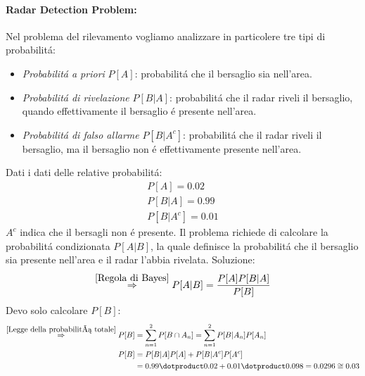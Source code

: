             \paragraph{Radar Detection Problem:} Nel problema del rilevamento vogliamo analizzare in particolere tre tipi di probabilitá:
                \begin{itemize}
                    \item {
                        \emph{Probabilitá a priori} $P[A]$: probabilitá che il bersaglio sia nell'area.
                    }
                    \item {
                        \emph{Probabilitá di rivelazione} $P[B|A]$: probabilitá che il radar riveli il bersaglio, quando effettivamente il bersaglio
                         é presente nell'area.
                    }
                    \item {
                        \emph{Probabilitá di falso allarme} $P[B|A^c]$: probabilitá che il radar riveli il bersaglio, ma il bersaglio non
                         é effettivamente presente nell'area. 
                    }
                \end{itemize}
                Dati i dati delle relative probabilitá:
                \begin{gather}
                    P[A] = 0.02 \nonumber \\
                    P[B|A] = 0.99 \nonumber \\
                    P[B|A^c] = 0.01 \nonumber 
                \end{gather}
                $A^c$ indica che il bersagli non é presente. Il problema richiede di calcolare la probabilitá condizionata
                $P[A|B]$, la quale definisce la probabilitá che il bersaglio sia presente nell'area e il radar l'abbia rivelata.
                Soluzione:
                \[
                    \overset{\ref{Regola di Bayes}}{\Rightarrow} P[A|B] = \frac{P[A]P[B|A]}{P[B]}    
                \]                    
                Devo solo calcolare $P[B]$:
                \begin{align}
                        \overset{\ref{Legge della probabilitá totale}}{\Rightarrow} P[B] &= \sum_{n=1}^{2} P[B\cap A_n] = \sum_{n=1}^{2} P[B|A_n] P[A_n] \nonumber \\
                        P[B] &= P[B|A]P[A] + P[B|A^c]P[A^c] \nonumber \\
                             &= 0.99\dotproduct 0.02 + 0.01 \dotproduct 0.098 = 0.0296 \cong 0.03  \nonumber       
                \end{align}

